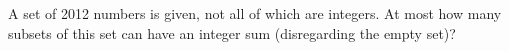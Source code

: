 \problem
A set of 2012 numbers is given, not all of which are integers.
At most how many subsets of this set can have an integer sum
(disregarding the empty set)?
\solution
\endproblem
